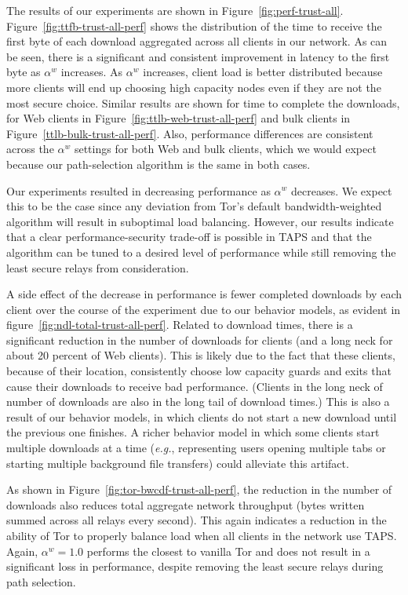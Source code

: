 \documentclass[conference]{styles/IEEEtran}
\newcommand{\eg}{\emph{e.g.}}
\newcommand{\ps}{TAPS\xspace}
\begin{document}
The results of our experiments are shown in Figure~\ref{fig:perf-trust-all}.
Figure~\ref{fig:ttfb-trust-all-perf} shows the distribution of the time to
receive the first byte of each download aggregated across all clients in our
network. As can be seen, there is a significant and consistent improvement in
latency to the first byte as $\alpha^w$ increases. As $\alpha^w$ increases,
client load is better distributed because more clients will end up choosing high
capacity nodes even if they are not the most secure choice. Similar results are
shown for time to complete the downloads, for Web clients in
Figure~\ref{fig:ttlb-web-trust-all-perf} and bulk clients in
Figure~\ref{ttlb-bulk-trust-all-perf}. Also,
performance differences are consistent across the $\alpha^w$ settings for both Web and
bulk clients, which we would expect because our path-selection algorithm is the same in
both cases.

Our experiments resulted in decreasing performance as $\alpha^w$ decreases. We expect this
to be the case since any deviation from Tor's default bandwidth-weighted algorithm
will result in suboptimal load balancing. However, our results indicate that a clear
performance-security trade-off is possible in \ps and that the algorithm
can be tuned to a desired level of performance while still removing the least
secure relays from consideration.

A side effect of the decrease in performance is fewer completed downloads by
each client over the course of the experiment due to our behavior models,
as evident in figure~\ref{fig:ndl-total-trust-all-perf}.
Related to download times, there is a significant reduction in the
number of downloads for clients (and a long neck for about 20 percent of Web
clients). This is likely due to the fact that these clients, because of their
location, consistently choose low capacity guards and exits that cause their
downloads to receive bad performance. (Clients in the long neck of number of
downloads are also in the long tail of download times.) This is also a result of
our behavior models, in which clients do not start a new download until the
previous one finishes. A richer behavior model in which some clients start multiple
downloads at a time (\eg{}, representing users opening multiple tabs or starting
multiple background file transfers) could alleviate this artifact.



As shown in Figure~\ref{fig:tor-bwcdf-trust-all-perf}, the reduction in the
number of downloads also reduces total aggregate network throughput (bytes
written summed across all relays every second). This again indicates a reduction
in the ability of Tor to properly balance load when all clients in the network use \ps.
Again, $\alpha^w=1.0$ performs the closest to vanilla Tor and does not result in a significant loss in performance, despite removing the least secure relays during path selection.
\end{document}
